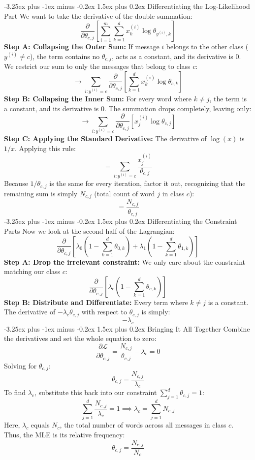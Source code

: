 \documentclass[twoside, 10pt]{article}
\makeatletter
\renewcommand{\paragraph}{\@startsection{paragraph}{4}{0pt}%
    {-3.25ex plus -1ex minus -0.2ex}%
    {1.5ex plus 0.2ex}%
    {\normalfont\normalsize\bfseries}}
\makeatother
\begin{document}
\paragraph{Differentiating the Log-Likelihood Part}
We want to take the derivative of the double summation:
\[
\frac{\partial}{\partial \theta_{c,j}} \left[ \sum_{i=1}^{m} \sum_{k=1}^{d} x_k^{(i)} \log \theta_{y^{(i)},k} \right]
\]
\textbf{Step A{:} Collapsing the Outer Sum:} If message $i$ belongs to the other class ($y^{(i)} \neq c$), the term contains no $\theta_{c,j}$, acts as a constant, and its derivative is 0. We restrict our sum to only the messages that belong to class $c$:
\[
\rightarrow \sum_{i: y^{(i)}=c} \frac{\partial}{\partial \theta_{c,j}} \left[ \sum_{k=1}^{d} x_k^{(i)} \log \theta_{c,k} \right]
\]
\textbf{Step B{:} Collapsing the Inner Sum:} For every word where $k \neq j$, the term is a constant, and its derivative is 0. The summation drops completely, leaving only:
\[
\rightarrow \sum_{i: y^{(i)}=c} \frac{\partial}{\partial \theta_{c,j}} \left[ x_j^{(i)} \log \theta_{c,j} \right]
\]
\textbf{Step C{:} Applying the Standard Derivative:} The derivative of $\log(x)$ is $1/x$. Applying this rule:
\[
= \sum_{i: y^{(i)}=c} \frac{x_j^{(i)}}{\theta_{c,j}}
\]
Because $1/\theta_{c,j}$ is the same for every iteration, factor it out, recognizing that the remaining sum is simply $N_{c,j}$ (total count of word $j$ in class $c$):
\[
= \frac{N_{c,j}}{\theta_{c,j}}
\]
\paragraph{Differentiating the Constraint Parts}
Now we look at the second half of the Lagrangian:
\[
\frac{\partial}{\partial \theta_{c,j}} \left[ \lambda_0 \left(1 - \sum_{k=1}^{d} \theta_{0,k}\right) + \lambda_1 \left(1 - \sum_{k=1}^{d} \theta_{1,k}\right) \right]
\]
\textbf{Step A{:} Drop the irrelevant constraint:} We only care about the constraint matching our class $c$:
\[
\frac{\partial}{\partial \theta_{c,j}} \left[ \lambda_c \left(1 - \sum_{k=1}^{d} \theta_{c,k}\right) \right]
\]
\textbf{Step B{:} Distribute and Differentiate:} Every term where $k \neq j$ is a constant. The derivative of $-\lambda_c \theta_{c,j}$ with respect to $\theta_{c,j}$ is simply:
\[
-\lambda_c
\]
\paragraph{Bringing It All Together}
Combine the derivatives and set the whole equation to zero:
\[
\frac{\partial \mathcal{L}}{\partial \theta_{c,j}} = \frac{N_{c,j}}{\theta_{c,j}} - \lambda_c = 0
\]
Solving for $\theta_{c,j}$:
\[
\theta_{c,j} = \frac{N_{c,j}}{\lambda_c}
\]
To find $\lambda_c$, substitute this back into our constraint $\sum_{j=1}^{d} \theta_{c,j} = 1$:
\[
\sum_{j=1}^{d} \frac{N_{c,j}}{\lambda_c} = 1 \implies \lambda_c = \sum_{j=1}^{d} N_{c,j}
\]
Here, $\lambda_c$ equals $N_c$, the total number of words across all messages in class $c$. Thus, the MLE is its relative frequency:
\[
\theta_{c,j} = \frac{N_{c,j}}{N_c}
\]
\end{document}
